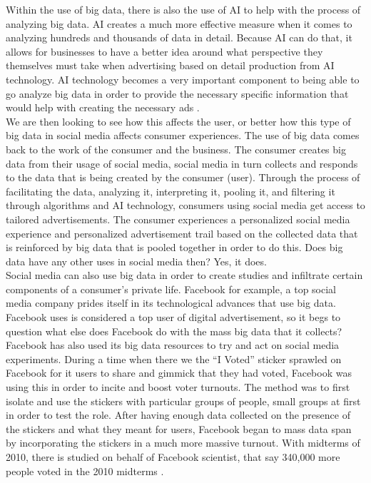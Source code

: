 \documentclass[sigconf]{acmart}
\begin{document}
Within the use of big data, there is also the use of AI to help with the process of analyzing big data. AI creates a much more effective measure when it comes to analyzing hundreds and thousands of data in detail. Because AI can do that, it allows for businesses to have a better idea around what perspective they themselves must take when advertising based on detail production from AI technology. AI technology becomes a very important component to being able to go analyze big data in order to provide the necessary specific information that would help with creating the necessary ads \cite{6}. \\

We are then looking to see how this affects the user, or better how this type of big data in social media affects consumer experiences. The use of big data comes back to the work of the consumer and the business. The consumer creates big data from their usage of social media, social media in turn collects and responds to the data that is being created by the consumer (user). Through the process of facilitating the data, analyzing it, interpreting it, pooling it, and filtering it through algorithms and AI technology, consumers using social media get access to tailored advertisements. The consumer experiences a personalized social media experience and personalized advertisement trail based on the collected data that is reinforced by big data that is pooled together in order to do this. Does big data have any other uses in social media then? Yes, it does. \\

Social media can also use big data in order to create studies and infiltrate certain components of a consumer’s private life. Facebook for example, a top social media company prides itself in its technological advances that use big data. Facebook uses is considered a top user of digital advertisement, so it begs to question what else does Facebook do with the mass big data that it collects? Facebook has also used its big data resources to try and act on social media experiments. During a time when there we the “I Voted” sticker sprawled on Facebook for it users to share and gimmick that they had voted, Facebook was using this in order to incite and boost voter turnouts. The method was to first isolate and use the stickers with particular groups of people, small groups at first in order to test the role. After having enough data collected on the presence of the stickers and what they meant for users, Facebook began to mass data span by incorporating the stickers in a much more massive turnout. With midterms of 2010, there is studied on behalf of Facebook scientist, that say 340,000 more people voted in the 2010 midterms \cite{9}. \\
\end{document}
